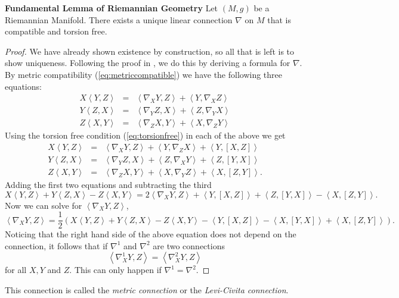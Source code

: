 \begin{thm}\label{FundLemma}\textbf{Fundamental Lemma of Riemannian Geometry}
Let $(M,g)$ be a Riemannian Manifold. There exists a unique linear connection $\nabla$ on $M$ that is compatible and 
torsion free.
\end{thm}
\begin{proof}
We have already shown existence by construction, so all that is left is to show uniqueness. Following the proof in \cite{Lee}, we do this by deriving a formula for $\nabla$. By metric compatibility (\ref{eq:metriccompatible}) we have the following three equations:
\begin{eqnarray*}
X\left<Y,Z\right>&=&\left<\nabla_X Y,Z\right> + \left<Y, \nabla_X Z \right>\\
Y\left<Z,X\right>&=&\left<\nabla_Y Z,X\right> + \left<Z, \nabla_Y X \right>\\
Z\left<X,Y\right>&=&\left<\nabla_Z X,Y\right> + \left<X, \nabla_Z Y \right>
\end{eqnarray*}
Using the torsion free condition (\ref{eq:torsionfree}) in each of the above we get
\begin{eqnarray*}
X\left<Y,Z\right>&=&\left<\nabla_X Y,Z\right> + \left<Y, \nabla_Z X \right>+\left<Y,[X,Z]\right>\\
Y\left<Z,X\right>&=&\left<\nabla_Y Z,X\right> + \left<Z, \nabla_X Y \right>+\left<Z,[Y,X]\right>\\
Z\left<X,Y\right>&=&\left<\nabla_Z X,Y\right> + \left<X, \nabla_Y Z \right>+\left<X,[Z,Y]\right>.
\end{eqnarray*}
Adding the first two equations and subtracting the third
\[ X\left<Y,Z\right>+Y\left<Z,X\right>-Z\left<X,Y\right>= 2\left<\nabla_X Y,Z\right> + \left<Y,[X,Z]\right> + \left<Z,[Y,X]\right>-\left<X,[Z,Y]\right>. \]
Now we can solve for $\left<\nabla_X Y,Z\right>$,
\[ \left<\nabla_X Y,Z\right>= \frac{1}{2}\left(X\left<Y,Z\right>+Y\left<Z,X\right>- Z\left<X,Y\right> -\left<Y,[X,Z]\right>-\left<X,[Y,X]\right>+\left<X,[Z,Y]\right>\right).\]
Noticing that the right hand side of the above equation does not depend on the connection, it follows that if $\nabla^1$ and $\nabla^2$ are two connections
\[ \left<\nabla^1_X Y,Z\right>=\left<\nabla^2_X Y,Z\right>\]
for all $X,Y$ and $Z$. This can only happen if $\nabla^1=\nabla^2$.
\end{proof}

This connection is called the \textit{metric connection} or the \textit{Levi-Civita connection}. 

